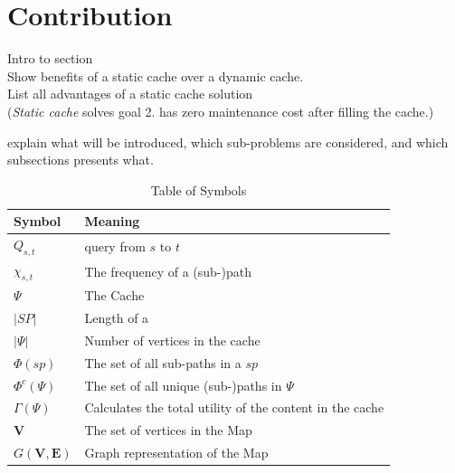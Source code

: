 





\section{Contribution} \label{sec:contribution}

Intro to section \\
Show benefits of a static cache over a dynamic cache.\\
List all advantages of a static cache solution \\
(\textit{Static cache} solves goal 2. has zero maintenance cost after filling the cache.)

explain what will be introduced, which sub-problems are considered, and which subsections presents what.


\begin{table}
\begin{tabular*}{\columnwidth}{|l|p{}|}
\hline
\bf Symbol		& \bf Meaning \\\hline
$Q_{s,t}$		& \spath query from $s$ to $t$ \\\hline
$\chi_{s,t}$		& The frequency of a (sub-)path \\\hline
$\Psi$ 			& The Cache \\\hline
$|SP|$			& Length of a \spath \\\hline
$|\Psi|$		& Number of vertices in the cache \\\hline
$\Phi(sp)$		& The set of all sub-paths in a \spath $sp$ \\\hline
$\Phi^c(\Psi)$		& The set of all unique (sub-)paths in $\Psi$ \\\hline
$\Gamma(\Psi)$		& Calculates the total utility of the content in the cache \\\hline 
$\mathbf{V}$ 		& The set of vertices in the Map \\\hline 
$G\mathbf{(V,E)}$ 	& Graph representation of the Map \\\hline 
\end{tabular*}
\caption{Table of Symbols}
\label{tab:symbols}
\end{table}


